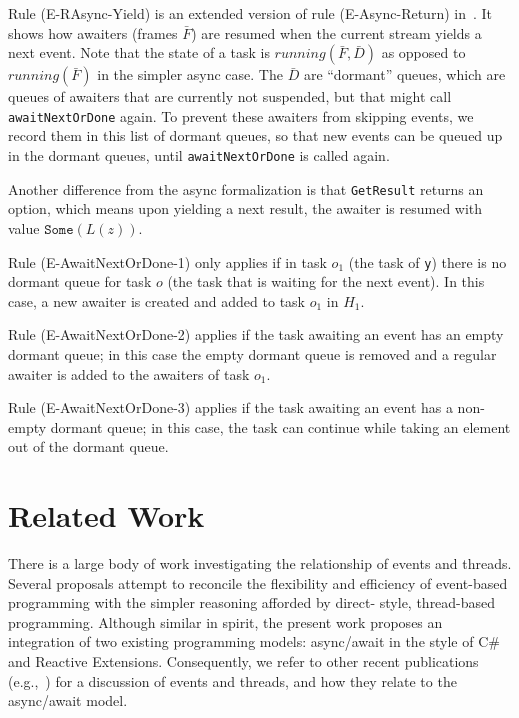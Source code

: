 \documentclass{acm_proc_article-sp}
\begin{document}
Rule (E-RAsync-Yield) is an extended version of rule (E-Async-Return)
in~\cite{FormalizingAsync}. It shows how awaiters (frames $\bar{F}$) are
resumed when the current stream yields a next event. Note that the state of a
task is $running(\bar{F}, \bar{D})$ as opposed to $running(\bar{F})$ in the
simpler async case. The $\bar{D}$ are ``dormant'' queues, which are queues of
awaiters that are currently not suspended, but that might call
\verb|awaitNextOrDone| again. To prevent these awaiters from skipping events,
we record them in this list of dormant queues, so that new events can be
queued up in the dormant queues, until \verb|awaitNextOrDone| is called again.

Another difference from the async formalization is that \verb|GetResult|
returns an option, which means upon yielding a next result, the awaiter is
resumed with value $\texttt{Some}(L(z))$.

Rule (E-AwaitNextOrDone-1) only applies if in task $o_1$ (the task of
\verb|y|) there is no dormant queue for task $o$ (the task that is waiting for
the next event). In this case, a new awaiter is created and added to task
$o_1$ in $H_1$.

Rule (E-AwaitNextOrDone-2) applies if the task awaiting an event has an empty
dormant queue; in this case the empty dormant queue is removed and a regular
awaiter is added to the awaiters of task $o_1$.

Rule (E-AwaitNextOrDone-3) applies if the task awaiting an event has a non-
empty dormant queue; in this case, the task can continue while taking an
element out of the dormant queue.

\section{Related Work}

There is a large body of work investigating the relationship of events and
threads. Several proposals attempt to reconcile the flexibility and efficiency
of event-based programming with the simpler reasoning afforded by direct-
style, thread-based programming. Although similar in spirit, the present work
proposes an integration of two existing programming models: async/await in the
style of C\# and Reactive Extensions. Consequently, we refer to other recent
publications (e.g.,~\cite{FormalizingAsync}) for a discussion of events and
threads, and how they relate to the async/await model.
\end{document}
